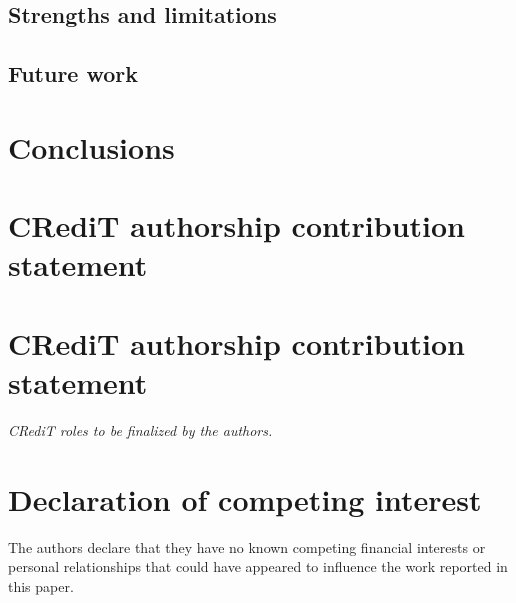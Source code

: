 \documentclass[final,5p,times,twocolumn]{elsarticle}
\begin{document}
\subsection{Strengths and limitations}\label{sec:limitations}
\lipsum[13]

\subsection{Future work}\label{sec:future-work}
\lipsum[14]

\section{Conclusions}\label{sec:conclusions}

\section*{CRediT authorship contribution statement}
\lipsum[7]

\section*{CRediT authorship contribution statement}
\textit{CRediT roles to be finalized by the authors.}

\section*{Declaration of competing interest}
The authors declare that they have no known competing financial interests or personal relationships that could have appeared to influence the work reported in this paper.
\end{document}
